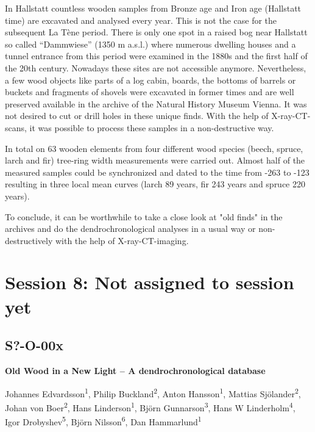 \documentclass[
]{book}
\begin{document}
In Hallstatt countless wooden samples from Bronze age and Iron age (Hallstatt time) are excavated and analysed every year. This is not the case for the subsequent La Tène period. There is only one spot in a raised bog near Hallstatt so called ``Dammwiese'' (1350 m a.s.l.) where numerous dwelling houses and a tunnel entrance from this period were examined in the 1880s and the first half of the 20th century. Nowadays these sites are not accessible anymore. Nevertheless, a few wood objects like parts of a log cabin, boards, the bottoms of barrels or buckets and fragments of shovels were excavated in former times and are well preserved available in the archive of the Natural History Museum Vienna. It was not desired to cut or drill holes in these unique finds. With the help of X-ray-CT-scans, it was possible to process these samples in a non-destructive way.

In total on 63 wooden elements from four different wood species (beech, spruce, larch and fir) tree-ring width measurements were carried out. Almost half of the measured samples could be synchronized and dated to the time from -263 to -123 resulting in three local mean curves (larch 89 years, fir 243 years and spruce 220 years).

To conclude, it can be worthwhile to take a close look at "old finds" in the archives and do the dendrochronological analyses in a usual way or non-destructively with the help of X-ray-CT-imaging.

\hypertarget{session-8-not-assigned-to-session-yet}{%
\chapter*{Session 8: Not assigned to session yet}\label{session-8-not-assigned-to-session-yet}}

\hypertarget{s-o-00x}{%
\section*{S?-O-00x}\label{s-o-00x}}

\textbf{Old Wood in a New Light -- A dendrochronological database}

Johannes Edvardsson\textsuperscript{1}, Philip Buckland\textsuperscript{2}, Anton Hansson\textsuperscript{1}, Mattias Sjölander\textsuperscript{2}, Johan von Boer\textsuperscript{2}, Hans Linderson\textsuperscript{1}, Björn Gunnarson\textsuperscript{3}, Hans W Linderholm\textsuperscript{4}, Igor Drobyshev\textsuperscript{5}, Björn Nilsson\textsuperscript{6}, Dan Hammarlund\textsuperscript{1}
\end{document}
